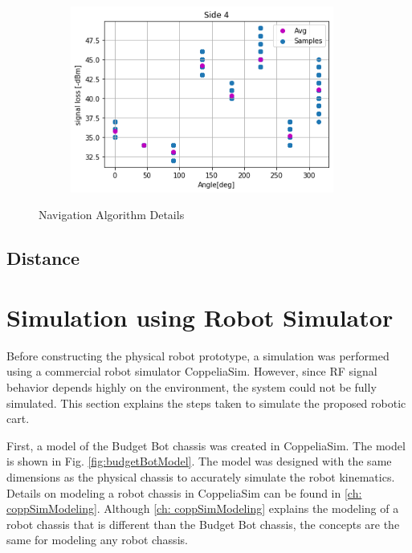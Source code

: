 \begin{figure}[H]
\begin{subfigure}{0.50\textwidth}
        \label{fig:Side3Dat}
    \end{subfigure}%
    \begin{subfigure}{0.50\textwidth}
        \centering
        \includegraphics[width=0.95\textwidth]{figs/img/Side4_Data.png}
        \label{fig:Side4Dat}
    \end{subfigure}
    \caption{Navigation Algorithm Details}
    \label{fig:SensorDataGraphs}
\end{figure}

\subsection{Distance}




\section{Simulation using Robot Simulator}

Before constructing the physical robot prototype, a simulation was performed using a commercial robot simulator CoppeliaSim. However, since RF signal behavior depends highly on the environment, the system could not be fully simulated. This section explains the steps taken to simulate the proposed robotic cart.

\vspace*{12pt}
\noindent
First, a model of the Budget Bot chassis was created in CoppeliaSim. The model is shown in Fig. \ref{fig:budgetBotModel}. The model was designed with the same dimensions as the physical chassis to accurately simulate the robot kinematics. Details on modeling a robot chassis in CoppeliaSim can be found in \autoref{ch: coppSimModeling}. Although \autoref{ch: coppSimModeling} explains the modeling of a robot chassis that is different than the Budget Bot chassis, the concepts are the same for modeling any robot chassis.

